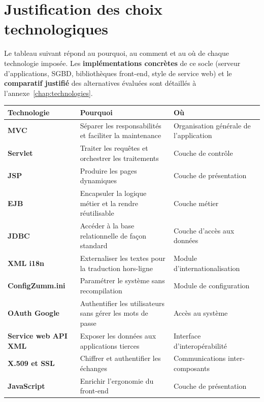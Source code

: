 \section{Justification des choix technologiques}
Le tableau suivant répond au pourquoi, au comment et au où de chaque technologie
imposée. Les \textbf{implémentations concrètes} de ce socle (serveur
d'applications, SGBD, bibliothèques front-end, style de service web) et le
\textbf{comparatif justifié} des alternatives évaluées sont détaillés à
l'annexe~\ref{chap:technologies}.
\begin{longtable}{>{\bfseries}p{2.6cm} p{6cm} p{5.4cm}}
\toprule
\textbf{Technologie} & \textbf{Pourquoi} & \textbf{Où} \\
\midrule
\endhead
MVC & Séparer les responsabilités et faciliter la maintenance & Organisation générale de l'application \\
Servlet & Traiter les requêtes et orchestrer les traitements & Couche de contrôle \\
JSP & Produire les pages dynamiques & Couche de présentation \\
EJB & Encapsuler la logique métier et la rendre réutilisable & Couche métier \\
JDBC & Accéder à la base relationnelle de façon standard & Couche d'accès aux données \\
XML i18n & Externaliser les textes pour la traduction hors-ligne & Module d'internationalisation \\
ConfigZumm.ini & Paramétrer le système sans recompilation & Module de configuration \\
OAuth Google & Authentifier les utilisateurs sans gérer les mots de passe & Accès au système \\
Service web API XML & Exposer les données aux applications tierces & Interface d'interopérabilité \\
X.509 et SSL & Chiffrer et authentifier les échanges & Communications inter-composants \\
JavaScript & Enrichir l'ergonomie du front-end & Couche de présentation \\
\bottomrule
\end{longtable}


